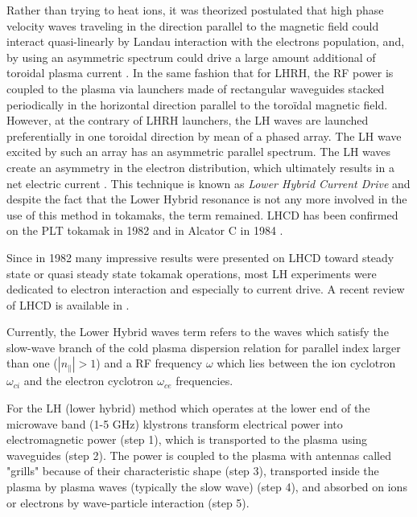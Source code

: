 Rather than trying to heat ions, it was theorized postulated that high phase velocity waves traveling in the direction parallel to the magnetic field could interact quasi-linearly by Landau interaction with the electrons population, and, by using an asymmetric spectrum could drive a large amount additional of toroidal plasma current . In the same fashion that for LHRH, the RF power is coupled to the plasma via launchers made of rectangular waveguides stacked periodically in the horizontal direction parallel to the toroïdal magnetic field. However, at the contrary of LHRH launchers, the LH waves are launched preferentially in one toroidal direction by mean of a phased array. The LH wave excited by such an array has an asymmetric parallel spectrum. The LH waves create an asymmetry in the electron distribution, which ultimately results in a net electric current . This technique is known as \emph{Lower Hybrid Current Drive} and despite the fact that the Lower Hybrid resonance is not any more involved in the use of this method in tokamaks, the term remained. LHCD has been confirmed on the PLT tokamak in 1982  and in Alcator C in 1984 . 

Since in 1982 many impressive results were presented on LHCD toward steady state or quasi steady state tokamak operations, most LH experiments were dedicated to electron interaction and especially to current drive. A recent review of LHCD is available in .

Currently, the Lower Hybrid waves term refers to the waves which satisfy the slow-wave branch of the cold plasma dispersion relation for parallel index larger than one ($|n_{\parallel}|>1$) and a RF frequency $\omega$ which lies between the ion cyclotron $\omega_{ci}$ and the electron cyclotron $\omega_{ce}$ frequencies. 

For the LH (lower hybrid) method which operates at the lower end of the microwave band (1-5 GHz) klystrons transform electrical power into electromagnetic power (step 1), which is transported to the plasma using waveguides (step 2). The power is coupled to the plasma with antennas called "grills" because of their characteristic shape (step 3), transported inside the plasma by plasma waves (typically the slow wave) (step 4), and absorbed on ions or electrons by wave-particle interaction (step 5).



